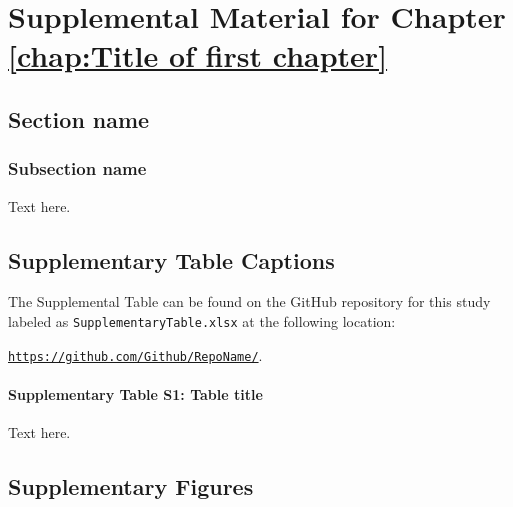\appendix{}

\chapter{Supplemental Material for Chapter \ref{chap:Title of first chapter}}

\section{Section name}

\subsection{Subsection name}
Text here.

\section{Supplementary Table Captions}

The Supplemental Table can be found on the GitHub repository for this study labeled as \verb|SupplementaryTable.xlsx| at the following location: 

\noindent \href{https://github.com/Github/RepoName/}{\texttt{https://github.com/Github/RepoName/}}.

\par\noindent\dotfill

\subsubsection{Supplementary Table S1: Table title}
Text here.

\section{Supplementary Figures}

